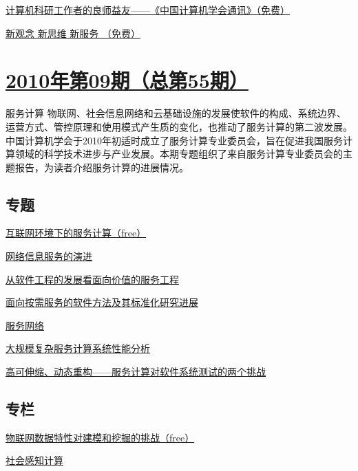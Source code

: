 \documentclass[a4paper]{article}
\begin{document}
\href{http://history.ccf.org.cn/resources/1190201776262/2010/10/20/zhengwen-1.pdf}{计算机科研工作者的良师益友——《中国计算机学会通讯》（免费）}

\href{http://history.ccf.org.cn/resources/1190201776262/2010/10/20/xuehuiluntan-1.pdf}{新观念 新思维 新服务 （免费）}


\section{\href{http://history.ccf.org.cn/sites/ccf/jsjtbbd.jsp?contentId=2568871040459}{\textbf{2010年第09期（总第55期）}}}
服务计算 物联网、社会信息网络和云基础设施的发展使软件的构成、系统边界、运营方式、管控原理和使用模式产生质的变化，也推动了服务计算的第二波发展。中国计算机学会于2010年初适时成立了服务计算专业委员会，旨在促进我国服务计算领域的科学技术进步与产业发展。本期专题组织了来自服务计算专业委员会的主题报告，为读者介绍服务计算的进展情况。
\subsection{专题}
\href{http://history.ccf.org.cn/resources/1190201776262/2010/09/14/201009-1.pdf}{互联网环境下的服务计算（free）}

\href{http://history.ccf.org.cn/resources/1190201776262/2010/09/15/201009-2.pdf}{网络信息服务的演进}

\href{http://history.ccf.org.cn/resources/1190201776262/2010/09/15/201009-3.pdf}{从软件工程的发展看面向价值的服务工程}

\href{http://history.ccf.org.cn/resources/1190201776262/2010/09/15/201009-4.pdf}{面向按需服务的软件方法及其标准化研究进展}

\href{http://history.ccf.org.cn/resources/1190201776262/2010/09/15/201009-5　.pdf}{服务网络}

\href{http://history.ccf.org.cn/resources/1190201776262/2010/09/15/201009-6.pdf}{大规模复杂服务计算系统性能分析}

\href{http://history.ccf.org.cn/resources/1190201776262/2010/09/15/201009-7.pdf}{高可伸缩、动态重构——服务计算对软件系统测试的两个挑战}

\subsection{专栏}
\href{http://history.ccf.org.cn/resources/1190201776262/2010/09/15/201009-8-zhuanlan-free.pdf}{物联网数据特性对建模和挖掘的挑战（free）}

\href{http://history.ccf.org.cn/resources/1190201776262/2010/09/15/201009-9.pdf}{社会感知计算}
\end{document}
